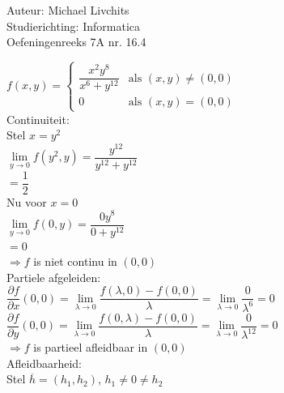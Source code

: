 \documentclass[a4paper]{article}
\begin{document}
  
\noindent \large Auteur: Michael Livchits \\
\noindent \large Studierichting: Informatica\\
\noindent \large Oefeningenreeks 7A nr. 16.4\\

\medskip

\normalsize

$f(x,y) = 
\left\{ 
\begin{array}{ll} 
\dfrac{x^2y^8}{x^6+y^{12}} & \text{als } (x,y) \neq (0,0)\\[2ex] 
0 & \text{als } (x,y) = (0,0) 
\end{array} 
\right.$ \\

Continuiteit:\\

Stel $x = y^2$\\

$\lim\limits_{y\rightarrow 0}f(y^2,y) = \dfrac{y^{12}}{y^{12}+y^{12}}$\\

$= \dfrac{1}{2}$\\

Nu voor $x = 0$\\

$\lim\limits_{y\rightarrow 0}f(0,y) = \dfrac{0y^{8}}{0+y^{12}}$\\

$= 0$\\

$\Rightarrow f$ is niet continu in $(0,0)$\\

Partiele afgeleiden:\\

$\dfrac{\partial f}{\partial x}(0,0) = \lim\limits_{\lambda \rightarrow 0} \dfrac{f(\lambda, 0) - f(0,0)}{\lambda} = \lim\limits_{\lambda \rightarrow 0}\dfrac{0}{\lambda^6} = 0$\\

$\dfrac{\partial f}{\partial y}(0,0) = \lim\limits_{\lambda \rightarrow 0} \dfrac{f(0, \lambda) - f(0,0)}{\lambda} = \lim\limits_{\lambda \rightarrow 0}\dfrac{0}{\lambda^{12}} = 0$\\

$\Rightarrow f$ is partieel afleidbaar in $(0,0)$\\

Afleidbaarheid:\\

Stel $\overline{h} = (h_1,h_2)$, $h_1\neq0\neq h_2$\\
\end{document}
